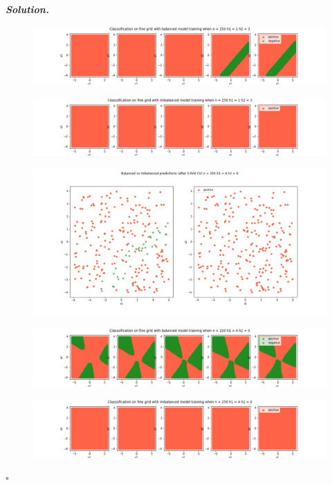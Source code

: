 \documentclass[10pt]{article}
\newenvironment{solution}[1][\it{Solution}]{\textbf{#1. } }{$\square$}
\begin{document}
\begin{solution}
\begin{figure}[H]
\end{figure}
\begin{figure}[H]
\includegraphics[width=16cm, keepaspectratio]{./3/5}
\end{figure}
\begin{figure}[H]
\includegraphics[width=16cm, keepaspectratio]{./3/6}
\end{figure}
\begin{figure}[H]
\includegraphics[width=16cm, keepaspectratio]{./3/7}
\end{figure}
\begin{figure}[H]
\includegraphics[width=16cm, keepaspectratio]{./3/8}
\end{figure}
\begin{figure}[H]
\includegraphics[width=16cm, keepaspectratio]{./3/9}

\end{figure}
\end{solution}
\end{document}
